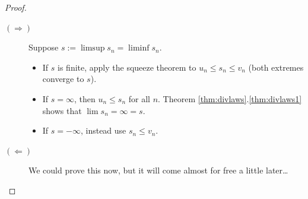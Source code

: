 \begin{proof}
	\begin{description}
		\item[$(\Rightarrow)$] Suppose $s:=\limsup s_n=\liminf s_n$.
		\begin{itemize}
		  \item If $s$ is finite, apply the squeeze theorem to $u_n\le s_n\le v_n$ (both extremes converge to $s$).
		  \item If $s=\infty$, then $u_n\le s_n$ for all $n$. Theorem \ref*{thm:divlaws}.\ref{thm:divlaws1} shows that $\lim s_n=\infty=s$.
		  \item If $s=-\infty$, instead use $s_n\le v_n$.
		\end{itemize}
		\item[$(\Leftarrow)$] We could prove this now, but it will come almost for free a little later\ldots\qedhere
	\end{description}

		


\end{proof}
